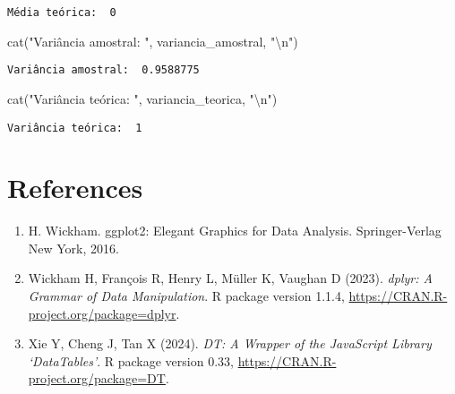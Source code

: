 \documentclass[
  letterpaper,
  DIV=11,
  numbers=noendperiod]{scrreprt}
\newenvironment{Shaded}{\begin{snugshade}}{\end{snugshade}}
\newcommand{\FunctionTok}[1]{\textcolor[rgb]{0.28,0.35,0.67}{#1}}
\newcommand{\NormalTok}[1]{\textcolor[rgb]{0.00,0.23,0.31}{#1}}
\newcommand{\SpecialCharTok}[1]{\textcolor[rgb]{0.37,0.37,0.37}{#1}}
\newcommand{\StringTok}[1]{\textcolor[rgb]{0.13,0.47,0.30}{#1}}
\begin{document}
\begin{verbatim}
Média teórica:  0 
\end{verbatim}

\begin{Shaded}
\begin{Highlighting}[]
\FunctionTok{cat}\NormalTok{(}\StringTok{"Variância amostral: "}\NormalTok{, variancia\_amostral, }\StringTok{"}\SpecialCharTok{\textbackslash{}n}\StringTok{"}\NormalTok{)}
\end{Highlighting}
\end{Shaded}

\begin{verbatim}
Variância amostral:  0.9588775 
\end{verbatim}

\begin{Shaded}
\begin{Highlighting}[]
\FunctionTok{cat}\NormalTok{(}\StringTok{"Variância teórica: "}\NormalTok{, variancia\_teorica, }\StringTok{"}\SpecialCharTok{\textbackslash{}n}\StringTok{"}\NormalTok{)}
\end{Highlighting}
\end{Shaded}

\begin{verbatim}
Variância teórica:  1 
\end{verbatim}


\chapter*{References}\label{references}


\begin{enumerate}
\def\labelenumi{\arabic{enumi}.}
\item
  H. Wickham. ggplot2: Elegant Graphics for Data Analysis.
  Springer-Verlag New York, 2016.
\item
  Wickham H, François R, Henry L, Müller K, Vaughan D (2023).
  \emph{dplyr: A Grammar of Data Manipulation}. R package version 1.1.4,
  \url{https://CRAN.R-project.org/package=dplyr}.
\item
  Xie Y, Cheng J, Tan X (2024). \emph{DT: A Wrapper of the JavaScript
  Library `DataTables'}. R package version 0.33,
  \url{https://CRAN.R-project.org/package=DT}.
\end{enumerate}
\end{document}
